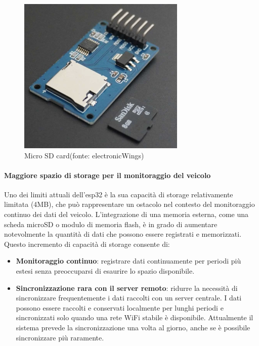 \documentclass[12pt, a4paper, italian]{report}
\numberwithin{figure}{chapter}
\numberwithin{table}{chapter}
\begin{document}
\begin{figure}[h]
  \centering
  \includegraphics[width=8cm]{MicroSD.png}
  \caption{Micro SD card\protect\footnotemark (fonte: electronicWings)}
  \label{fig:MicroSD}
\end{figure}

\paragraph{Maggiore spazio di storage per il monitoraggio del veicolo} 
Uno dei limiti attuali dell'esp32 è la sua capacità di storage relativamente limitata (4MB), che può rappresentare un ostacolo nel contesto del monitoraggio continuo dei dati del veicolo. L'integrazione di una memoria esterna, come una scheda microSD o modulo di memoria flash, è in grado di aumentare notevolmente la quantità di dati che possono essere registrati e memorizzati. Questo incremento di capacità di storage consente di:

\begin{itemize}
    \item \textbf{Monitoraggio continuo}: registrare dati continuamente per periodi più estesi senza preoccuparsi di esaurire lo spazio disponibile.
    \item \textbf{Sincronizzazione rara con il server remoto}: ridurre la necessità di sincronizzare frequentemente i dati raccolti con un server centrale. I dati possono essere raccolti e conservati localmente per lunghi periodi e sincronizzati solo quando una rete WiFi stabile è disponibile. Attualmente il sistema prevede la sincronizzazione una volta al giorno, anche se è possibile sincronizzare più raramente.
\end{itemize}
\end{document}
